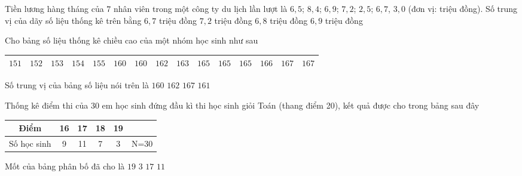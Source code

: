 \begin{ex}%
	Tiền lương hàng tháng của $7$ nhân viên trong một công ty du lịch lần lượt là $6{,}5$; $8{,}4$; $6{,}9$; $7{,}2$; $2{,}5$; $6{,}7$, $3{,}0$ (đơn vị: triệu đồng). Số trung vị của dãy số liệu thống kê trên bằng 
	\choice
	{\True $6{,}7$ triệu đồng}
	{$7{,}2$ triệu đồng}
	{$6{,}8$ triệu đồng}
	{$6{,}9$ triệu đồng}
\end{ex}

\begin{ex}%
	Cho bảng số liệu thống kê chiều cao của một nhóm học sinh như sau
	\begin{center}
		\begin{tabular}{|c|c|c|c|c|c|c|c|c|c|c|c|c|c|c|}
			\hline
			$151$	&$152$&$153$&$154$&$155$&$160$&$160$&$162$&$163$&$165$&$165$&$165$&$166$&$167$&$167$\\
			\hline
		\end{tabular}
	\end{center}
	Số trung vị của bảng số liệu nói trên là
	\choice
	{$160$}
	{\True $162$}
	{$167$}
	{$161$}
\end{ex}

\begin{ex}%
Thống kê điểm thi của $30$ em học sinh đứng đầu kì thi học sinh giỏi Toán (thang điểm 20), kết quả được cho trong  bảng sau đây
\begin{center}
	\begin{tabular}{|c|c|c|c|c|c|}
	\hline
	Điểm & 16 & 17 & 18 & 19 &  \\
	\hline
	Số học sinh & 9 & 11 & 7 & 3 & N=30 \\
	\hline
\end{tabular}
\end{center}
Mốt của bảng phân bố đã cho là 
	\choice
	{$19$}
	{$3$}
	{\True $17$}
	{$11$}
\end{ex}

